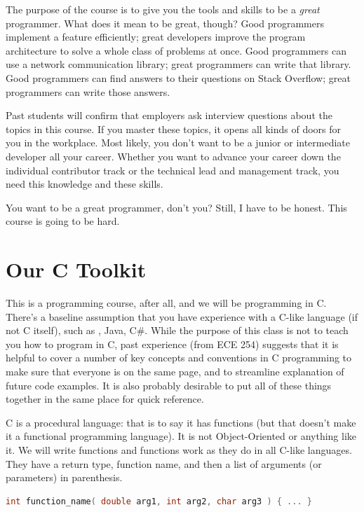 The purpose of the course is to give you the tools and skills to be a \textit{great} programmer. What does it mean to be great, though? Good programmers implement a feature efficiently; great developers improve the program architecture to solve a whole class of problems at once. Good programmers can use a network communication library; great programmers can write that library. Good programmers can find answers to their questions on Stack Overflow; great programmers can write those answers.

Past students will confirm that employers ask interview questions about the topics in this course. If you master these topics, it opens all kinds of doors for you in the workplace. Most likely, you don't want to be a junior or intermediate developer all your career. Whether you want to advance your career down the individual contributor track or the technical lead and management track, you need this knowledge and these skills.

You want to be a great programmer, don't you? Still, I have to be honest. This course is going to be hard. 

\section*{Our C Toolkit}

This is a programming course, after all, and we will be programming in C. There's a baseline assumption that you have experience with a C-like language (if not C itself), such as \Cpp, Java, C\#. While the purpose of this class is not to teach you how to program in C, past experience (from ECE 254) suggests that it is helpful to cover a number of key concepts and conventions in C programming to make sure that everyone is on the same page, and to streamline explanation of future code examples. It is also probably desirable to put all of these things together in the same place for quick reference.

C is a procedural language: that is to say it has functions (but that doesn't make it a functional programming language). It is not Object-Oriented or anything like it. We will write functions and functions work as they do in all C-like languages. They have a return type, function name, and then a list of arguments (or parameters) in parenthesis.

\begin{lstlisting}[language=C]
int function_name( double arg1, int arg2, char arg3 ) { ... }
\end{lstlisting}

